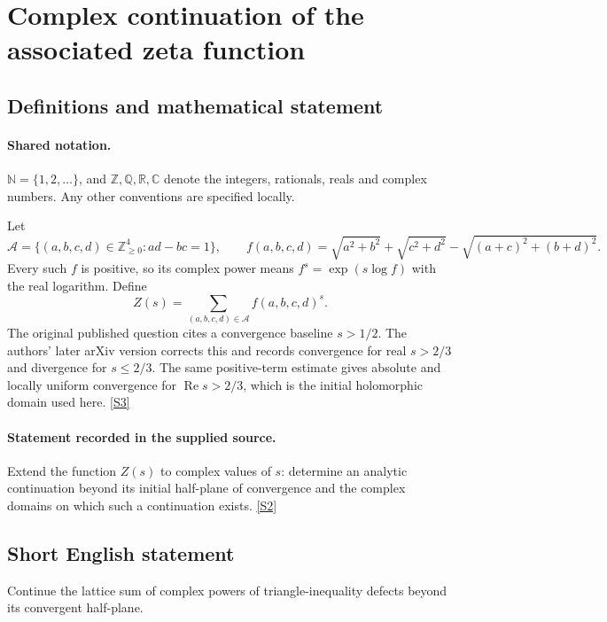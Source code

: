 \documentclass[11pt]{article}
\newcommand{\sref}[2]{\hyperlink{source:#1:#2}{[S#2]}}
\begin{document}
\section{Complex continuation of the associated zeta function}\label{statement}

\subsection{Definitions and mathematical statement}

\paragraph{Shared notation.}$\mathbb N=\{1,2,\ldots\}$, and $\mathbb Z,\mathbb Q,\mathbb R,\mathbb C$ denote the integers, rationals, reals and complex numbers. Any other conventions are specified locally.


Let
\[
\mathcal A=\{(a,b,c,d)\in\mathbb Z_{\ge0}^{4}:ad-bc=1\},\qquad
f(a,b,c,d)=\sqrt{a^2+b^2}+\sqrt{c^2+d^2}-\sqrt{(a+c)^2+(b+d)^2}.
\]
Every such $f$ is positive, so its complex power means $f^s=\exp(s\log f)$ with the real logarithm. Define
\[
Z(s)=\sum_{(a,b,c,d)\in\mathcal A} f(a,b,c,d)^s.
\]
The original published question cites a convergence baseline $s>1/2$. The authors' later arXiv version corrects this and records convergence for real $s>2/3$ and divergence for $s\le2/3$. The same positive-term estimate gives absolute and locally uniform convergence for $\operatorname{Re}s>2/3$, which is the initial holomorphic domain used here. \sref{statement}{3}
\paragraph{Statement recorded in the supplied source.}
Extend the function $Z(s)$ to complex values of $s$: determine an analytic continuation beyond its initial half-plane of convergence and the complex domains on which such a continuation exists. \sref{statement}{2}
\subsection{Short English statement}
Continue the lattice sum of complex powers of triangle-inequality defects beyond its convergent half-plane.
\end{document}

